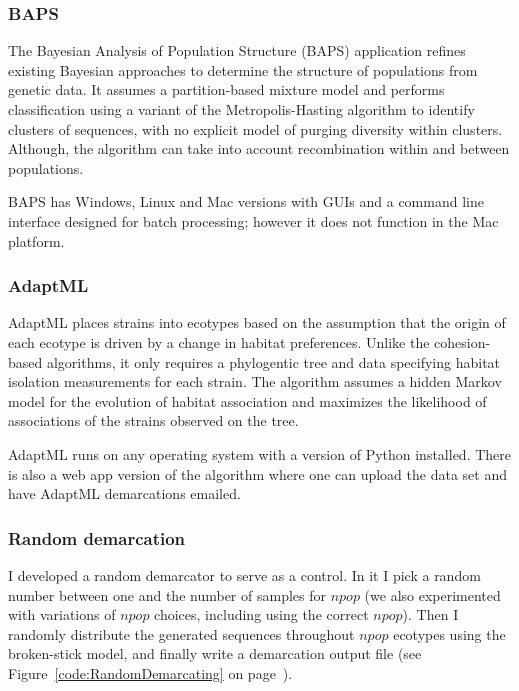 \subsubsection*{BAPS~\cite{corander2007bayesian}}
The Bayesian Analysis of Population Structure (BAPS) application refines existing Bayesian approaches to determine the structure of populations from genetic data.
It assumes a partition-based mixture model and performs classification using a variant of the Metropolis-Hasting algorithm to identify clusters of sequences, with no explicit model of purging diversity within clusters.
Although, the algorithm can take into account recombination within and between populations.

BAPS has Windows, Linux and Mac versions with GUIs and a command line interface designed for batch processing; however it does not function in the Mac platform.

\subsubsection*{AdaptML~\cite{hunt2008resource}}
AdaptML places strains into ecotypes based on the assumption that the origin of each ecotype is driven by a change in habitat preferences.
Unlike the cohesion-based algorithms, it only requires a phylogentic tree and data specifying habitat isolation measurements for each strain.
The algorithm assumes a hidden Markov model for the evolution of habitat association and maximizes the likelihood of associations of the strains observed on the tree.

AdaptML runs on any operating system with a  version of Python installed. There is also a web app version of the algorithm where one can upload the data set and have AdaptML demarcations emailed.

\subsubsection*{Random demarcation}
I developed a random demarcator to serve as a control.
In it I pick a random number between one and the number of samples for $npop$ (we also experimented with variations of $npop$ choices, including using the correct $npop$). 
Then I randomly distribute the generated sequences throughout $npop$ ecotypes using the broken-stick model, and finally write a demarcation output file (see Figure~\ref{code:RandomDemarcating} on page~\pageref{code:RandomDemarcating}).


